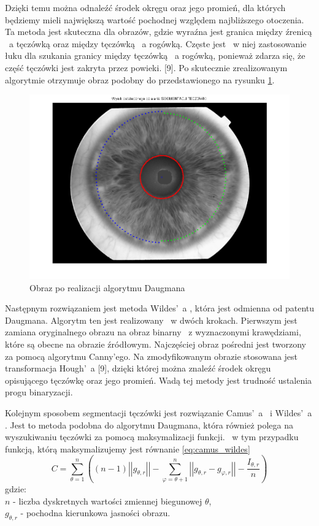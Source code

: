 Dzięki temu można odnaleźć środek okręgu oraz jego promień, dla których będziemy mieli największą wartość pochodnej względem najbliższego otoczenia. Ta metoda jest skuteczna dla obrazów, gdzie wyraźna jest granica między źrenicą ~a tęczówką oraz między tęczówką ~a rogówką. Częste jest ~w niej zastosowanie łuku dla szukania granicy między tęczówką ~a rogówką, ponieważ zdarza się, że część tęczówki jest zakryta przez powieki. [9]. Po skutecznie zrealizowanym algorytmie otrzymuje obraz podobny do przedstawionego na rysunku \ref{fig:przykladDaugman}.
\begin{figure}
\begin{center}
\includegraphics[scale=0.5]{calosc.png}
\caption{Obraz po realizacji algorytmu Daugmana}
\label{fig:przykladDaugman}
\end{center}
\end{figure}

Następnym rozwiązaniem jest metoda Wildes'~a \cite{Wildes}, która jest odmienna od patentu Daugmana. Algorytm ten jest realizowany ~w dwóch krokach. Pierwszym jest zamiana oryginalnego obrazu na obraz binarny ~z wyznaczonymi krawędziami, które są obecne na obrazie źródłowym. Najczęściej obraz pośredni jest tworzony za pomocą algorytmu Canny'ego. Na zmodyfikowanym obrazie stosowana jest transformacja Hough'~a [9], dzięki której można znaleźć środek okręgu opisującego tęczówkę oraz jego promień. Wadą tej metody jest trudność ustalenia progu binaryzacji.

Kolejnym sposobem segmentacji tęczówki jest rozwiązanie Camus'~a ~i Wildes'~a \cite{Camus}. Jest to metoda podobna do algorytmu Daugmana, która również polega na wyszukiwaniu tęczówki za pomocą maksymalizacji funkcji. ~w tym przypadku funkcją, którą maksymalizujemy jest równanie \ref{eq:camus_wildes} 
\begin{equation}
\label{eq:camus_wildes}
C=\sum_{\theta =1}^{n} ((n-1)\left|\left| g_{\theta,r} \right|\right| - \sum_{\varphi=\theta + 1 } ^{n} \left| \left| g_{\theta,r} - g_{\varphi,r} \right| \right| - \frac{I_{\theta,r}}{n}  )
\end{equation}
gdzie:\\
$ n $ - liczba dyskretnych wartości zmiennej biegunowej $ \theta $, \\
$ g_{\theta, r} $ - pochodna kierunkowa jasności obrazu.

